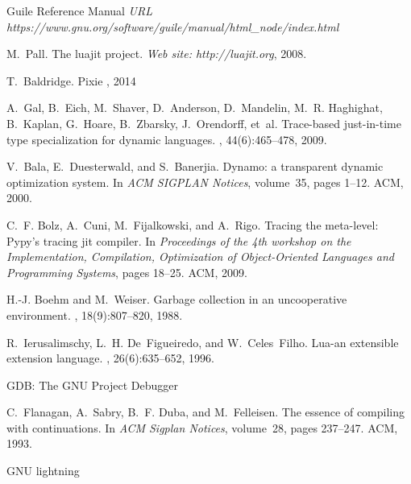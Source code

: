 \documentclass[preprint, numbers]{sigplanconf}
\begin{document}
\begin{thebibliography}{}
 Guile Reference Manual \newblock
  {\em URL https://www.gnu.org/software/guile/manual/html\_node/index.html}

 M.~Pall.  \newblock The luajit project.  \newblock
  {\em Web site: http://luajit.org}, 2008.

 T.~Baldridge.  \newblock Pixie , 2014

A.~Gal, B.~Eich, M.~Shaver, D.~Anderson, D.~Mandelin, M.~R. Haghighat,
  B.~Kaplan, G.~Hoare, B.~Zbarsky, J.~Orendorff, et~al.
\newblock Trace-based just-in-time type specialization for dynamic languages.
, 44(6):465--478, 2009.

V.~Bala, E.~Duesterwald, and S.~Banerjia.
\newblock Dynamo: a transparent dynamic optimization system.
\newblock In {\em ACM SIGPLAN Notices}, volume~35, pages 1--12. ACM, 2000.

C.~F. Bolz, A.~Cuni, M.~Fijalkowski, and A.~Rigo.
\newblock Tracing the meta-level: Pypy's tracing jit compiler.
\newblock In {\em Proceedings of the 4th workshop on the Implementation,
  Compilation, Optimization of Object-Oriented Languages and Programming
  Systems}, pages 18--25. ACM, 2009.

H.-J. Boehm and M.~Weiser.
\newblock Garbage collection in an uncooperative environment.
, 18(9):807--820, 1988.

R.~Ierusalimschy, L.~H. De~Figueiredo, and W.~Celes~Filho.
\newblock Lua-an extensible extension language.
, 26(6):635--652, 1996.

  \newblock GDB: The GNU Project Debugger

C.~Flanagan, A.~Sabry, B.~F. Duba, and M.~Felleisen.
\newblock The essence of compiling with continuations.
\newblock In {\em ACM Sigplan Notices}, volume~28, pages 237--247. ACM, 1993.

  \newblock GNU lightning

\end{thebibliography}
\end{document}
